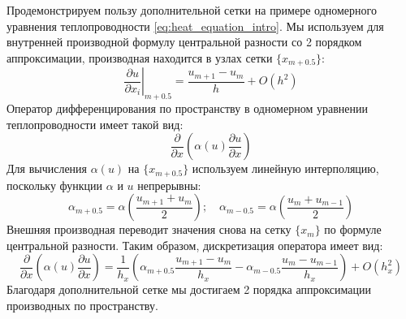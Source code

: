 \par
Продемонстрируем пользу дополнительной сетки на примере одномерного уравнения теплопроводности \eqref{eq:heat_equation_intro}. Мы используем для внутренней производной формулу центральной разности со 2 порядком аппроксимации, производная находится в узлах сетки $\{ x_{m+0.5}\}$:
\begin{equation}
\left.\frac{\partial u}{\partial x_i} \right\vert_{m+0.5}= \frac{u_{m+1} - u_m}{h} + O(h^2)
\end{equation}
Оператор дифференцирования по пространству в одномерном уравнении теплопроводности имеет такой вид:
\begin{equation}
\frac{\partial}{\partial x} \left( \alpha(u) \frac{\partial u}{\partial x}\right)
\end{equation}
Для вычисления $\alpha(u)$ на $\{ x_{m+0.5}\}$ используем линейную интерполяцию, поскольку функции $\alpha$ и $u$ непрерывны:
\begin{equation}
\alpha_{m+0.5} = \alpha(\frac{u_{m+1} + u_{m}} {2});
\quad 
\alpha_{m-0.5} = \alpha(\frac{u_{m} + u_{m - 1}} {2})
\end{equation}
Внешняя производная переводит значения снова на сетку $\{ x_m \}$ по формуле центральной разности. Таким образом, дискретизация оператора имеет вид:
\begin{equation}
\frac{\partial }{\partial x} \left( \alpha (u) \frac{\partial u}{\partial x} \right)  = \frac{1}{h_x} \left( \alpha_{m+0.5} \frac{u_{m+1} - u_m}{h_x} - \alpha_{m-0.5} \frac{u_{m} - u_{m-1}}{h_x} \right) + O(h_x^2)
\end{equation}
Благодаря дополнительной сетке мы достигаем 2 порядка аппроксимации производных по пространству.
